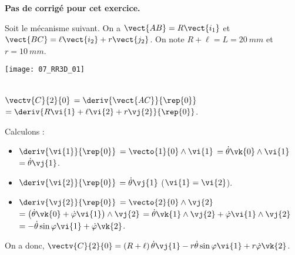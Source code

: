 \normaltrue \difficilefalse \tdifficilefalse
\correctionfalse


\setcounter{numques}{0}
\ifcorrection
\else
\textbf{Pas de corrigé pour cet exercice.}
\fi

\ifprof
\else
Soit le mécanisme suivant. On a $\vect{AB}=R\vect{i_1}$ et $\vect{BC}=\ell\vect{i_2}+r\vect{j_2}$. On note $R+\ell=L = \SI{20}{mm}$ et $r=\SI{10}{mm}$.
\begin{center}
\texttt{[image: 07\_RR3D\_01]}
\end{center}
\fi

\ifprof ~\\
$\vectv{C}{2}{0}$ 
$=\deriv{\vect{AC}}{\rep{0}}$ 
$=\deriv{R\vi{1}+\ell\vi{2}+r\vj{2}}{\rep{0}}$.

Calculons : 
\begin{itemize}
\item $\deriv{\vi{1}}{\rep{0}}$ $=\vecto{1}{0} \wedge \vi{1}$ $=\dot{\theta}\vk{0} \wedge \vi{1}$ $=\dot{\theta}\vj{1}$.
\item $\deriv{\vi{2}}{\rep{0}}$ $=\dot{\theta}\vj{1}$ ($\vi{1}=\vi{2}$).
\item $\deriv{\vj{2}}{\rep{0}}$ $=\vecto{2}{0} \wedge \vj{2}$ 
$=\left(\dot{\theta}\vk{0}+ \dot{\varphi}\vi{1} \right) \wedge \vj{2}$
$=\dot{\theta}\vk{1} \wedge \vj{2}+ \dot{\varphi}\vi{1}  \wedge \vj{2}$
$=-\dot{\theta}\sin\varphi \vi{1} + \dot{\varphi}\vk{2} $.
\end{itemize}

On a donc, 
$\vectv{C}{2}{0}= \left(R+\ell\right)\dot{\theta}\vj{1} -r\dot{\theta}\sin\varphi \vi{1} + r\dot{\varphi}\vk{2}$.
\else
\fi


